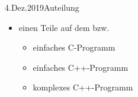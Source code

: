\documentclass{beamer}
\begin{document}
\begin{frame}{4.Dez.2019}{Auteilung }
 \begin{itemize}
 \item einen Teile auf dem \host bzw. \target 
 \begin{itemize}
  \item einfaches C-Programm
  \item einfaches C++-Programm
  \item komplexes C++-Programm
 \end{itemize}
 \end{itemize}
\end{frame}
\end{document}
